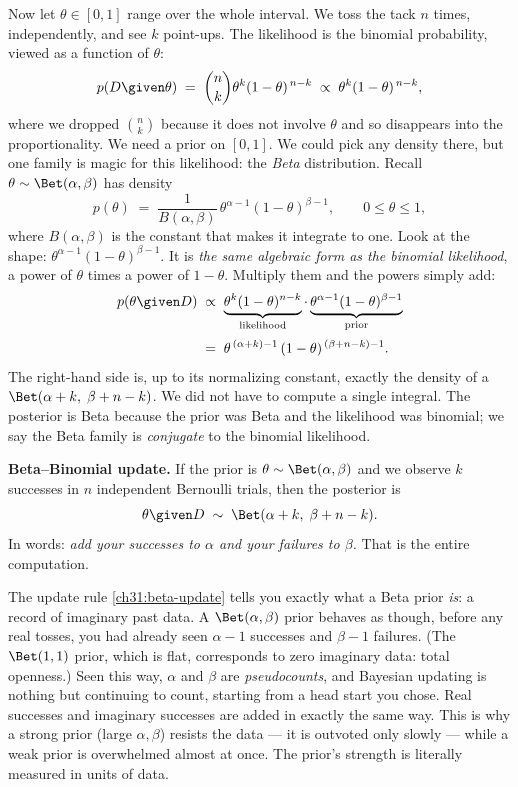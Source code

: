 Now let $\theta \in [0,1]$ range over the whole interval. We toss the tack $n$ times,
independently, and see $k$ point-ups. The likelihood is the binomial probability, viewed
as a function of $\theta$:
\[
  p(D \given \theta) \;=\; \binom{n}{k}\theta^{k}(1-\theta)^{\,n-k}
  \;\propto\; \theta^{k}(1-\theta)^{\,n-k},
\]
where we dropped $\binom{n}{k}$ because it does not involve $\theta$ and so disappears into
the proportionality. We need a prior on $[0,1]$. We could pick any density there, but one
family is magic for this likelihood: the \emph{Beta} distribution. Recall
$\theta \sim \Bet(\alpha,\beta)$ has density
\[
  p(\theta) \;=\; \frac{1}{B(\alpha,\beta)}\,\theta^{\alpha-1}(1-\theta)^{\beta-1},
  \qquad 0 \le \theta \le 1,
\]
where $B(\alpha,\beta)$ is the constant that makes it integrate to one. Look at the shape:
$\theta^{\alpha-1}(1-\theta)^{\beta-1}$. It is \emph{the same algebraic form as the
binomial likelihood}, a power of $\theta$ times a power of $1-\theta$. Multiply them and
the powers simply add:
\begin{align*}
  p(\theta \given D)
  &\;\propto\; \underbrace{\theta^{k}(1-\theta)^{n-k}}_{\text{likelihood}}
      \cdot \underbrace{\theta^{\alpha-1}(1-\theta)^{\beta-1}}_{\text{prior}} \\[2pt]
  &\;=\; \theta^{\,(\alpha+k)-1}\,(1-\theta)^{\,(\beta + n - k)-1}.
\end{align*}
The right-hand side is, up to its normalizing constant, exactly the density of a
$\Bet(\alpha + k,\; \beta + n - k)$. We did not have to compute a single integral. The
posterior is Beta because the prior was Beta and the likelihood was binomial; we say the
Beta family is \emph{conjugate} to the binomial likelihood.

\begin{formalbox}
\textbf{Beta--Binomial update.} If the prior is $\theta \sim \Bet(\alpha,\beta)$ and we
observe $k$ successes in $n$ independent Bernoulli trials, then the posterior is
\begin{equation}
  \theta \given D \;\sim\; \Bet(\alpha + k,\; \beta + n - k).
  \label{ch31:beta-update}
\end{equation}
In words: \emph{add your successes to $\alpha$ and your failures to $\beta$.} That is the
entire computation.
\end{formalbox}

\begin{happeningbox}
The update rule \eqref{ch31:beta-update} tells you exactly what a Beta prior \emph{is}: a
record of imaginary past data. A $\Bet(\alpha,\beta)$ prior behaves as though, before any
real tosses, you had already seen $\alpha-1$ successes and $\beta-1$ failures. (The
$\Bet(1,1)$ prior, which is flat, corresponds to zero imaginary data: total openness.)
Seen this way, $\alpha$ and $\beta$ are \emph{pseudocounts}, and Bayesian updating is
nothing but continuing to count, starting from a head start you chose. Real successes and
imaginary successes are added in exactly the same way. This is why a strong prior (large
$\alpha,\beta$) resists the data --- it is outvoted only slowly --- while a weak prior is
overwhelmed almost at once. The prior's strength is literally measured in units of data.
\end{happeningbox}

